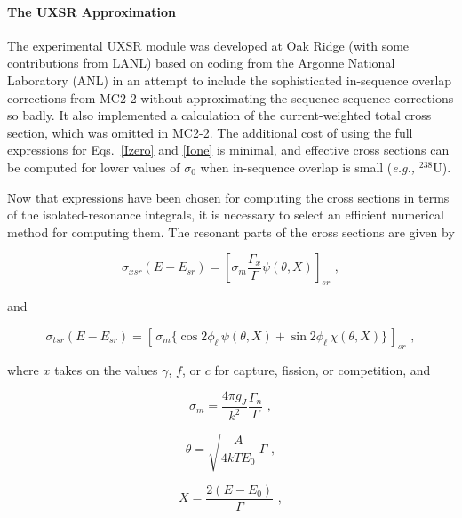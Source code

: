 \paragraph{The UXSR Approximation}
The experimental UXSR module was developed at Oak Ridge
 (with some contributions from
LANL)
based on coding from the Argonne National Laboratory (ANL)
in an attempt to include the sophisticated in-sequence overlap corrections
from MC2-2 without approximating the sequence-sequence corrections
so badly.  It also implemented a calculation of the current-weighted
total cross section, which was omitted in MC2-2.  The additional
cost of using the full expressions for Eqs.~\ref{Izero} and \ref{Ione}
is minimal, and effective cross sections can be computed for
lower values of $\sigma_0$ when in-sequence overlap is
small ({\it e.g.,} $^{238}$U).

Now that expressions have been chosen for computing the cross
sections in terms of the isolated-resonance integrals, it is
necessary to select an efficient numerical method for computing
them.  The resonant parts of the cross sections are given by

\begin{equation}
  \sigma_{xsr}(E{-}E_{sr}) = \left[ \sigma_m\frac{\Gamma_x}{\Gamma}
    \psi(\theta,X) \right]_{sr}\,\,,
\end{equation}

\noindent
and

\begin{equation}
   \sigma_{tsr}(E{-}E_{sr})=\left[\, \sigma_m\{\cos 2\phi_\ell
     \,\psi(\theta,X) + \sin 2\phi_\ell\,\chi(\theta,X)\}\,\right]_{sr}\,\,,
\end{equation}

\noindent
where $x$ takes on the values $\gamma$, $f$, or $c$ for capture,
fission, or competition, and

\begin{equation}
   \sigma_m=\frac{4\pi g_J}{k^2}\frac{\Gamma_n}{\Gamma}\,\,,
\end{equation}

\begin{equation}
   \theta=\sqrt{\frac{A}{4kTE_0}}\,\Gamma\,\,,
\end{equation}

\begin{equation}
   X=\frac{2(E-E_0)}{\Gamma}\,\,,
\end{equation}

